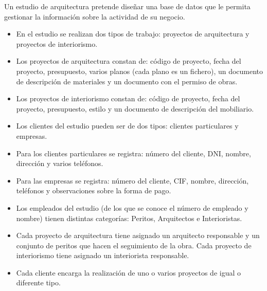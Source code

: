 \begin{ejercicio} \label{ej:20}
    Un estudio de arquitectura pretende diseñar una base de datos que le permita gestionar la información sobre
    la actividad de su negocio.
    \begin{itemize}
        \item En el estudio se realizan dos tipos de trabajo: proyectos de arquitectura y proyectos de interiorismo.
        \item Los proyectos de arquitectura constan de: código de proyecto, fecha del proyecto, presupuesto, varios
        planos (cada plano es un fichero), un documento de descripción de materiales y un documento con el
        permiso de obras.
        \item Los proyectos de interiorismo constan de: código de proyecto, fecha del proyecto, presupuesto, estilo
        y un documento de descripción del mobiliario.
        \item Los clientes del estudio pueden ser de dos tipos: clientes particulares y empresas.
        \item Para los clientes particulares se registra: número del cliente, DNI, nombre, dirección y varios teléfonos.
        \item Para las empresas se registra: número del cliente, CIF, nombre, dirección, teléfonos y observaciones
        sobre la forma de pago.
        \item Los empleados del estudio (de los que se conoce el número de empleado y nombre) tienen distintas
        categorías: Peritos, Arquitectos e Interioristas.
        \item Cada proyecto de arquitectura tiene asignado un arquitecto responsable y un conjunto de peritos que
        hacen el seguimiento de la obra. Cada proyecto de interiorismo tiene asignado un interiorista
        responsable.
        \item Cada cliente encarga la realización de uno o varios proyectos de igual o diferente tipo.
    \end{itemize}
\end{ejercicio}

